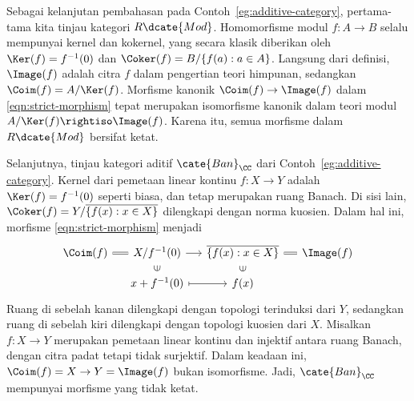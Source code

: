\begin{contoh}\label{eg:strict-morphism}
	Sebagai kelanjutan pembahasan pada Contoh~\ref{eg:additive-category},
	pertama-tama kita tinjau kategori $R\dcate{Mod}$. Homomorfisme modul
	$f: A \to B$ selalu mempunyai
	kernel dan kokernel, yang secara klasik diberikan oleh
	$\Ker(f)=f^{-1}(0)$ dan
	$\Coker(f)=B/\{f(a):a \in A\}$. Langsung dari definisi, $\Image(f)$ adalah
	citra $f$ dalam pengertian teori himpunan, sedangkan
	$\Coim(f)=A/\Ker(f)$. Morfisme kanonik
	$\Coim(f) \to \Image(f)$ dalam \eqref{eqn:strict-morphism} tepat
	merupakan isomorfisme kanonik dalam teori modul
	$A/\Ker(f) \rightiso \Image(f)$. Karena itu, semua morfisme dalam
	$R\dcate{Mod}$ bersifat ketat.

	Selanjutnya, tinjau kategori aditif $\cate{Ban}_{\CC}$ dari
	Contoh~\ref{eg:additive-category}. Kernel dari pemetaan linear kontinu
	$f: X \to Y$ adalah $\Ker(f)=f^{-1}(0)$ seperti biasa, dan tetap merupakan
	ruang Banach. Di sisi lain,
	$\Coker(f)=Y/\overline{\left\{f(x):x \in X\right\}}$ dilengkapi dengan
	norma kuosien. Dalam hal ini, morfisme \eqref{eqn:strict-morphism} menjadi
	\[\begin{tikzcd}[row sep=small, column sep=small]
	\Coim(f) \arrow[equal, r] & X/f^{-1}(0) \arrow[r] & \overline{\left\{ f(x): x \in X \right\}} \arrow[equal, r] & \Image(f) \\
	& x + f^{-1}(0) \arrow[mapsto, r] \arrow[phantom, u, "\in" description, sloped] & f(x) \arrow[phantom, u, "\in" description, sloped] &
	\end{tikzcd}\]
	Ruang di sebelah kanan dilengkapi dengan topologi terinduksi dari $Y$,
	sedangkan ruang di sebelah kiri dilengkapi dengan topologi kuosien dari
	$X$. Misalkan
	$f: X \to Y$ merupakan pemetaan linear kontinu dan injektif antara ruang
	Banach, dengan citra padat tetapi tidak surjektif. Dalam keadaan ini,
	$\Coim(f)=X \to Y=\Image(f)$ bukan isomorfisme. Jadi,
	$\cate{Ban}_{\CC}$ mempunyai morfisme yang tidak ketat.
\end{contoh}
